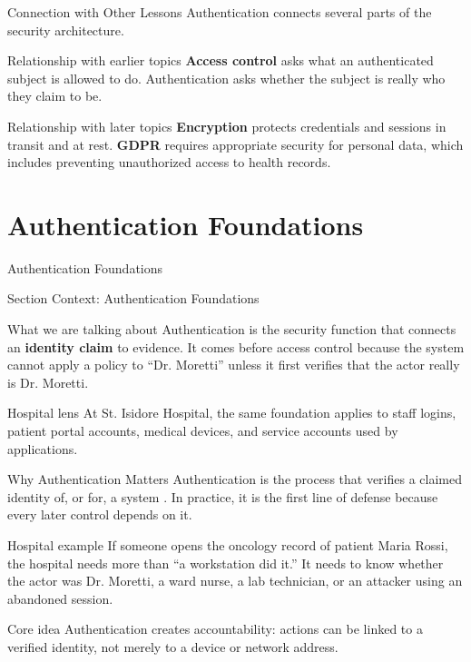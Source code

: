 \documentclass[presentation]{beamer}
\newcommand{\sectiontitleframe}[1]{
\begin{frame}[plain,c]
\begin{center}
{\usebeamerfont{title}\usebeamercolor[fg]{title}#1}
\end{center}
\end{frame}
}
\newcommand{\scenario}{St. Isidore Hospital}
\begin{document}
\begin{frame}[c]{Connection with Other Lessons}
  Authentication connects several parts of the security architecture.

  \begin{block}{Relationship with earlier topics}
    \textbf{Access control} asks what an authenticated subject is allowed to do. Authentication asks whether the subject is really who they claim to be.
  \end{block}

  \begin{block}{Relationship with later topics}
    \textbf{Encryption} protects credentials and sessions in transit and at rest. \textbf{GDPR} requires appropriate security for personal data, which includes preventing unauthorized access to health records.
  \end{block}
\end{frame}

\section{Authentication Foundations}
\sectiontitleframe{Authentication Foundations}

\begin{frame}[c]{Section Context: Authentication Foundations}
\begin{block}{What we are talking about}
Authentication is the security function that connects an \textbf{identity claim} to evidence. It
comes before access control because the system cannot apply a policy to ``Dr. Moretti'' unless it
first verifies that the actor really is Dr. Moretti.
\end{block}

\begin{exampleblock}{Hospital lens}
At \scenario, the same foundation applies to staff logins, patient portal accounts, medical devices,
and service accounts used by applications.
\end{exampleblock}
\end{frame}

\begin{frame}[c]{Why Authentication Matters}
  Authentication is the process that verifies a claimed identity of, or for, a system \cite{rfc4949}. In practice, it is the first line of defense because every later control depends on it.

  \begin{exampleblock}{Hospital example}
    If someone opens the oncology record of patient Maria Rossi, the hospital needs more than ``a workstation did it.'' It needs to know whether the actor was Dr. Moretti, a ward nurse, a lab technician, or an attacker using an abandoned session.
  \end{exampleblock}

  \begin{block}{Core idea}
    Authentication creates accountability: actions can be linked to a verified identity, not merely to a device or network address.
  \end{block}
\end{frame}
\end{document}
